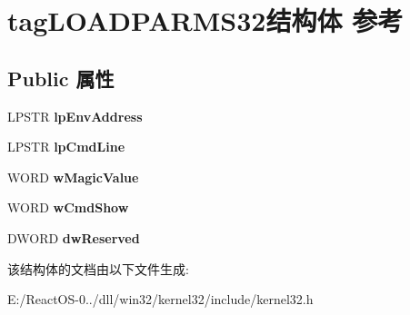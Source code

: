 \hypertarget{structtag_l_o_a_d_p_a_r_m_s32}{}\section{tag\+L\+O\+A\+D\+P\+A\+R\+M\+S32结构体 参考}
\label{structtag_l_o_a_d_p_a_r_m_s32}
\subsection*{Public 属性}
\begin{DoxyCompactItemize}
\item 
\mbox{\label{structtag_l_o_a_d_p_a_r_m_s32_a047ad73804ec7881f2ed7b59b5b9b6b3}} 
L\+P\+S\+TR {\bfseries lp\+Env\+Address}
\item 
\mbox{\label{structtag_l_o_a_d_p_a_r_m_s32_ac3e6b4407484a850c40af3a49340738e}} 
L\+P\+S\+TR {\bfseries lp\+Cmd\+Line}
\item 
\mbox{\label{structtag_l_o_a_d_p_a_r_m_s32_af2ffb32da14fb371c2b0a113ce5c7979}} 
W\+O\+RD {\bfseries w\+Magic\+Value}
\item 
\mbox{\label{structtag_l_o_a_d_p_a_r_m_s32_a928b0cae496fd6c2b0a6045f4d812262}} 
W\+O\+RD {\bfseries w\+Cmd\+Show}
\item 
\mbox{\label{structtag_l_o_a_d_p_a_r_m_s32_a09fe0a5b32e8f5d1df0290056d0ed42f}} 
D\+W\+O\+RD {\bfseries dw\+Reserved}
\end{DoxyCompactItemize}


该结构体的文档由以下文件生成\+:\begin{DoxyCompactItemize}
\item 
E\+:/\+React\+O\+S-\/0../dll/win32/kernel32/include/kernel32.\+h\end{DoxyCompactItemize}
